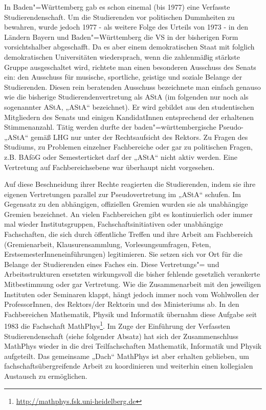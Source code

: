 In Baden"=Württemberg gab es schon einemal (bis 1977) eine Verfasste
Studierendenschaft. Um die Studierenden vor politischen Dummheiten zu
bewahren, wurde jedoch 1977 - als weitere Folge des Urteils von 1973 - in
den Ländern Bayern und Baden"=Württemberg die VS in der bisherigen Form
vorsichtshalber abgeschafft. Da es aber einem demokratischen Staat mit
folglich demokratischen Universitäten wiedersprach, wenn die
zahlenmäßig stärkste Gruppe ausgeschaltet wird, richtete man einen
besonderen Ausschuss des Senats ein: den Ausschuss für musische,
sportliche, geistige und soziale Belange der Studierenden. Diesen rein
beratenden Ausschuss bezeichnete man einfach genauso wie die bisherige
Studierendenvertretung als AStA (im folgenden nur noch als sogenannter
AStA, „AStA“ bezeichnet). Er wird gebildet aus den studentischen
Mitgliedern des Senats und einigen KandidatInnen entsprechend der
erhaltenen Stimmenanzahl. Tätig werden durfte der baden"=württembergische
Pseudo-„AStA“ gemäß LHG nur unter der Rechtsaufsicht des Rektors. Zu
Fragen des Studiums, zu Problemen einzelner Fachbereiche oder gar zu
politischen Fragen, z.B. BAföG oder Semesterticket darf der „AStA“ nicht
aktiv werden. Eine Vertretung auf Fachbereichsebene war überhaupt nicht
vorgesehen.

Auf diese Beschneidung ihrer Rechte reagierten die
Studierenden, indem sie ihre eigenen Vertretungen parallel zur
Pseudovertretung im „AStA“ schufen. Im Gegensatz zu den abhängigen,
offiziellen Gremien wurden sie als unabhängige Gremien bezeichnet.
An vielen Fachbereichen gibt es kontinuierlich oder immer mal wieder
Institutsgruppen, Fachschaftsinitiativen oder unabhängige Fachschaften,
die sich durch öffentliche Treffen und ihre Arbeit am Fachbereich
(Gremienarbeit, Klausurensammlung, Vorlesungsumfragen, Feten,
ErstsemesterInneneinführungen) legitimieren. Sie setzen sich vor Ort für
die Belange der Studierenden eines Faches ein. Diese Vertretungs"= und
Arbeitsstrukturen ersetzten wirkungsvoll die bisher fehlende gesetzlich verankerte
Mitbestimmung oder gar Vertretung. Wie die Zusammenarbeit mit den
jeweiligen Instituten oder Seminaren klappt, hängt jedoch immer noch vom
Wohlwollen der ProfessorInnen, des Rektors/der Rektorin und des Ministeriums ab. In den
Fachbereichen Mathematik, Physik und Informatik übernahm diese Aufgabe
seit 1983 die Fachschaft MathPhys\footnote{\url{http://mathphys.fsk.uni-heidelberg.de}}.
Im Zuge der Einführung der Verfassten Studierendenschaft (siehe folgender Absatz) hat sich der Zusammenschluss MathPhys
wieder in die drei Teilfachschaften Mathematik, Informatik und Physik aufgeteilt.
Das gemeinsame „Dach“ MathPhys ist aber erhalten geblieben, um fachschaftsübergreifende
Arbeit zu koordinieren und weiterhin einen kollegialen Austausch zu ermöglichen.



